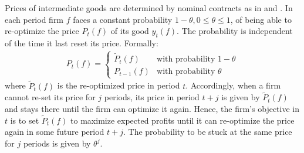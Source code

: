 Prices of intermediate goods are determined by nominal contracts as in \textcite{Calvo_1983_StaggeredPricesUtilitymaximizing} and \textcite{Yun_1996_NominalPriceRigidity}.
In each period firm \(f\) faces a constant probability \(1-\theta, 0\leq \theta \leq 1\), of being able to re-optimize the price \(P_t(f)\) of its good \(y_t(f)\).
The probability is independent of the time it last reset its price.
Formally:
\begin{align}
P_t(f) = \begin{cases}
\widetilde{P}_t(f) & \text{with probability } 1-\theta
\\
P_{t-1}(f) & \text{with probability } \theta
\end{cases}
\label{eq:NewKeynesianCalvoMechanism}
\end{align}
where \(\widetilde{P}_t(f)\) is the re-optimized price in period \(t\).
Accordingly, when a firm cannot re-set its price for \(j\) periods, its price in period \(t+j\) is given by \(\widetilde{P}_t(f)\)
  and stays there until the firm can optimize it again.
Hence, the firm's objective in \(t\) is to set \(\widetilde{P}_t(f)\) to maximize expected profits
  until it can re-optimize the price again in some future period \(t+j\).
The probability to be stuck at the same price for \(j\) periods is given by \(\theta^j\).

